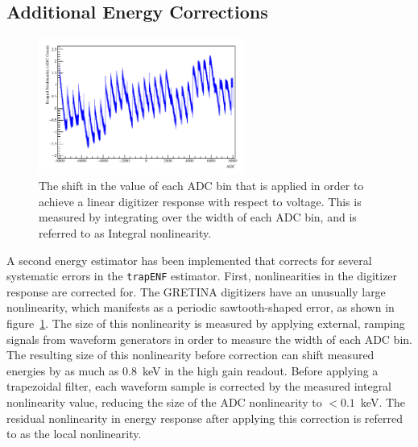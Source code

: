 \documentclass[/main.tex]{subfiles}
\begin{document}
\subsection{Additional Energy Corrections} \label{sec:energy}
\begin{figure}
  \centering
  \includegraphics[width=0.6\textwidth]{dignonlin}
  \caption[Integral digitizer nonlinearity]{\label{fig:localnonlin}
    The shift in the value of each ADC bin that is applied in order to achieve a linear digitizer response with respect to voltage. This is measured by integrating over the width of each ADC bin, and is referred to as Integral nonlinearity.
  }
\end{figure}
A second energy estimator has been implemented that corrects for several systematic errors in the \texttt{trapENF} estimator\cite{energyunidoc}.
First, nonlinearities in the digitizer response are corrected for.
The GRETINA digitizers have an unusually large nonlinearity, which manifests as a periodic sawtooth-shaped error, as shown in figure~\ref{fig:localnonlin}.
The size of this nonlinearity is measured by applying external, ramping signals from waveform generators in order to measure the width of each ADC bin.
The resulting size of this nonlinearity before correction can shift measured energies by as much as 0.8~keV in the high gain readout.
Before applying a trapezoidal filter, each waveform sample is corrected by the measured integral nonlinearity value, reducing the size of the ADC nonlinearity to $<0.1$~keV.
The residual nonlinearity in energy response after applying this correction is referred to as the local nonlinearity.
\\
\end{document}
